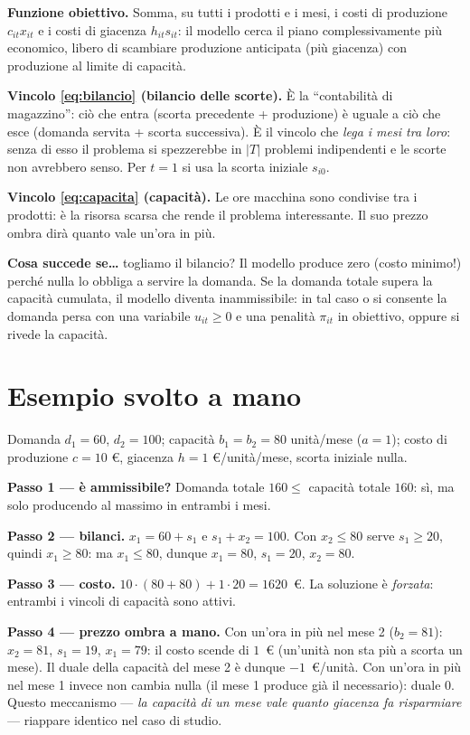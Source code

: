 \begin{spiegazione}
\textbf{Funzione obiettivo.} Somma, su tutti i prodotti e i mesi, i costi di
produzione $c_{it} x_{it}$ e i costi di giacenza $h_{it} s_{it}$: il modello cerca il
piano complessivamente più economico, libero di scambiare produzione anticipata
(più giacenza) con produzione al limite di capacità.

\textbf{Vincolo \eqref{eq:bilancio} (bilancio delle scorte).} È la ``contabilità di
magazzino'': ciò che entra (scorta precedente + produzione) è uguale a ciò che esce
(domanda servita + scorta successiva). È il vincolo che \emph{lega i mesi tra loro}: senza
di esso il problema si spezzerebbe in $|T|$ problemi indipendenti e le scorte non
avrebbero senso. Per $t=1$ si usa la scorta iniziale $s_{i0}$.

\textbf{Vincolo \eqref{eq:capacita} (capacità).} Le ore macchina sono condivise tra i
prodotti: è la risorsa scarsa che rende il problema interessante. Il suo prezzo ombra
dirà quanto vale un'ora in più.

\textbf{Cosa succede se\dots} togliamo il bilancio? Il modello produce zero (costo
minimo!) perché nulla lo obbliga a servire la domanda. Se la domanda totale supera la
capacità cumulata, il modello diventa inammissibile: in tal caso o si consente la
domanda persa con una variabile $u_{it} \ge 0$ e una penalità $\pi_{it}$ in obiettivo,
oppure si rivede la capacità.
\end{spiegazione}

\section{Esempio svolto a mano}

\begin{esempio}
Domanda $d_1 = 60$, $d_2 = 100$; capacità $b_1 = b_2 = 80$ unità/mese ($a = 1$);
costo di produzione $c = 10$ \euro, giacenza $h = 1$ \euro/unità/mese, scorta iniziale nulla.

\textbf{Passo 1 — è ammissibile?} Domanda totale $160 \le$ capacità totale $160$: sì,
ma solo producendo al massimo in entrambi i mesi.

\textbf{Passo 2 — bilanci.} $x_1 = 60 + s_1$ e $s_1 + x_2 = 100$. Con $x_2 \le 80$
serve $s_1 \ge 20$, quindi $x_1 \ge 80$: ma $x_1 \le 80$, dunque $x_1 = 80$, $s_1 = 20$,
$x_2 = 80$.

\textbf{Passo 3 — costo.} $10\cdot(80+80) + 1\cdot 20 = 1620$~\euro. La soluzione è
\emph{forzata}: entrambi i vincoli di capacità sono attivi.

\textbf{Passo 4 — prezzo ombra a mano.} Con un'ora in più nel mese 2
($b_2 = 81$): $x_2 = 81$, $s_1 = 19$, $x_1 = 79$: il costo scende di $1$~\euro{}
(un'unità non sta più a scorta un mese). Il duale della capacità del mese 2 è
dunque $-1$~\euro/unità. Con un'ora in più nel mese 1 invece non cambia nulla
(il mese 1 produce già il necessario): duale $0$.
Questo meccanismo --- \emph{la capacità di un mese vale quanto giacenza fa risparmiare} ---
riappare identico nel caso di studio.
\end{esempio}

